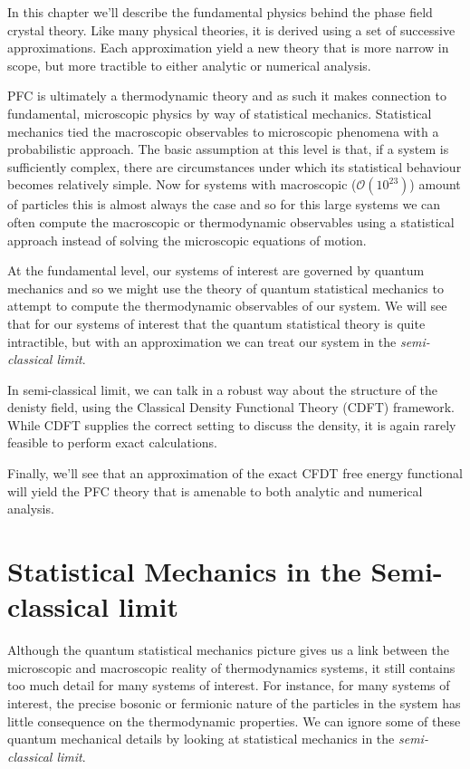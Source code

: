 In this chapter we'll describe the fundamental physics behind the phase field crystal theory.
Like many physical theories, it is derived using a set of successive approximations.
Each approximation yield a new theory that is more narrow in scope, but more tractible to either analytic or numerical analysis.

PFC is ultimately a thermodynamic theory and as such it makes connection to fundamental, microscopic physics by way of statistical mechanics.
Statistical mechanics tied the macroscopic observables to microscopic phenomena with a probabilistic approach.
The basic assumption at this level is that, if a system is sufficiently complex, there are circumstances under which its statistical behaviour becomes relatively simple.
Now for systems with macroscopic ($\mathcal{O}(10^{23})$) amount of particles this is almost always the case and so for this large systems we can often compute the macroscopic or thermodynamic observables using a statistical approach instead of solving the microscopic equations of motion.

At the fundamental level, our systems of interest are governed by quantum mechanics and so we might use the theory of quantum statistical mechanics to attempt to compute the thermodynamic observables of our system.
We will see that for our systems of interest that the quantum statistical theory is quite intractible, but with an approximation we can treat our system in the \textit{semi-classical limit}.

In semi-classical limit, we can talk in a robust way about the structure of the denisty field, using the Classical Density Functional Theory (CDFT) framework.
While CDFT supplies the correct setting to discuss the density, it is again rarely feasible to perform exact calculations.

Finally, we'll see that an approximation of the exact CFDT free energy functional will yield the PFC theory that is amenable to both analytic and numerical analysis.

\section{Statistical Mechanics in the Semi-classical limit}

Although the quantum statistical mechanics picture gives us a link between the microscopic and macroscopic reality of thermodynamics systems, it still contains too much detail for many systems of interest.
For instance, for many systems of interest, the precise bosonic or fermionic nature of the particles in the system has little consequence on the thermodynamic properties.
We can ignore some of these quantum mechanical details by looking at statistical mechanics in the \textit{semi-classical limit}.

